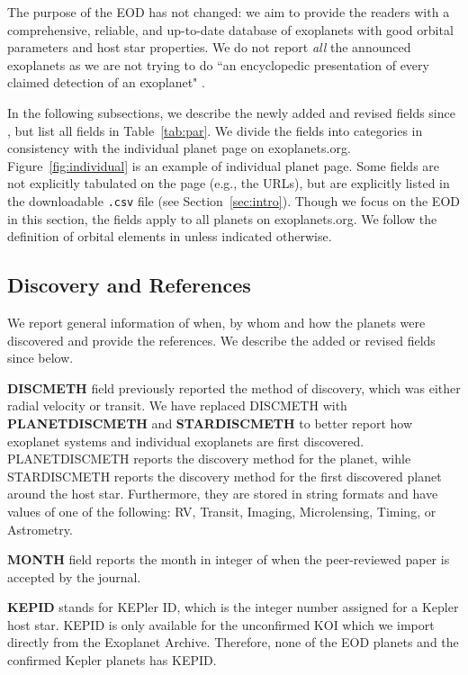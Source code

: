 \documentclass[11pt,preprint]{aastex}
\begin{document}
\begin{CJK*}{UTF8}{gbsn}
The purpose of the EOD has not changed: we aim to provide the readers
with a comprehensive, reliable, and up-to-date database of exoplanets
with good orbital parameters and host star properties. We do not
report \textit{all} the announced exoplanets as we are not trying to
do ``an encyclopedic presentation of every claimed detection of an
exoplanet" \citep{Wright2011}.

In the following subsections, we describe the newly added and revised
fields since \cite{Wright2011}, but list all fields in
Table~\ref{tab:par}. We divide the fields into categories in
consistency with the individual planet page on
exoplanets.org. Figure~\ref{fig:individual} is an example of
individual planet page. Some fields are not explicitly tabulated on
the page (e.g., the URLs), but are explicitly listed in the
downloadable {\tt .csv} file (see Section~\ref{sec:intro}). Though we
focus on the EOD in this section, the fields apply to all planets on
exoplanets.org. We follow the definition of orbital elements in
\cite{Wright2013} unless indicated otherwise.


\subsection{Discovery and References}\label{sec:disc}

We report general information of when, by whom and how the planets
were discovered and provide the references. We describe the added or
revised fields since \cite{Wright2011} below.

{\bf DISCMETH} field previously reported the method of discovery,
which was either radial velocity or transit. We have replaced DISCMETH
with {\bf PLANETDISCMETH} and \mbox{{\bf STARDISCMETH}} to better
report how exoplanet systems and individual exoplanets are first
discovered. PLANETDISCMETH reports the discovery method for the
planet, wihle STARDISCMETH reports the discovery method for the first
discovered planet around the host star. Furthermore, they are stored
in string formats and have values of one of the following: RV,
Transit, Imaging, Microlensing, Timing, or Astrometry.

{\bf MONTH} field reports the month in integer of when the
peer-reviewed paper is accepted by the journal.

{\bf KEPID} stands for KEPler ID, which is the integer number assigned
for a Kepler host star. KEPID is only available for the unconfirmed
KOI which we import directly from the Exoplanet Archive. Therefore,
none of the EOD planets and the confirmed Kepler planets has KEPID.


\end{CJK*}
\end{document}
